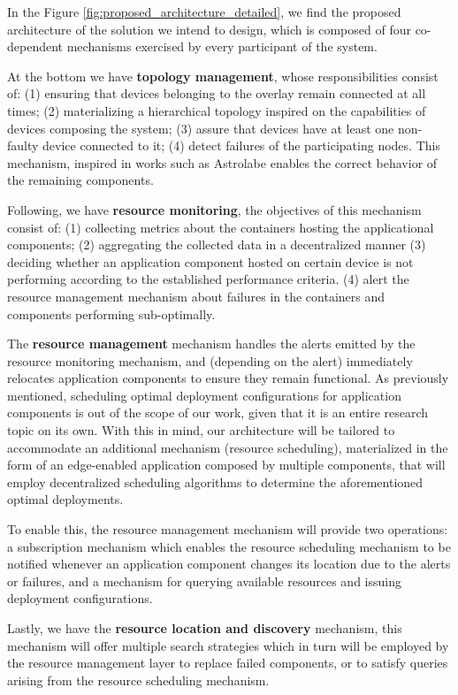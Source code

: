 In the Figure \ref{fig:proposed_architecture_detailed}, we find the proposed architecture of the solution we intend to design, which is composed of four co-dependent mechanisms exercised by every participant of the system.

At the bottom we have \textbf{topology management}, whose responsibilities consist of: (1) ensuring that devices belonging to the overlay remain connected at all times; (2) materializing a hierarchical topology inspired on the capabilities of devices composing the system; (3) assure that devices have at least one non-faulty device connected to it; (4) detect failures of the participating nodes. This mechanism, inspired in works such as Astrolabe \cite{Renesse2003} enables the correct behavior of the remaining components.

Following, we have \textbf{resource monitoring}, the objectives of this mechanism consist of: (1) collecting metrics about the containers hosting the applicational components; (2) aggregating the collected data in a decentralized manner (3) deciding whether an application component hosted on certain device is not performing according to the established performance criteria. (4) alert the resource management mechanism about failures in the containers and components performing sub-optimally.

The \textbf{resource management} mechanism handles the alerts emitted by the resource monitoring mechanism, and (depending on the alert) immediately relocates application components to ensure they remain functional. As previously mentioned, scheduling optimal deployment configurations for application components is out of the scope of our work, given that it is an entire research topic on its own. With this in mind, our architecture will be tailored to accommodate an additional mechanism (resource scheduling), materialized in the form of an edge-enabled application composed by multiple components, that will employ decentralized scheduling algorithms to determine the aforementioned optimal deployments.

To enable this, the resource management mechanism will provide two operations: a subscription mechanism which enables the resource scheduling mechanism to be notified whenever an application component changes its location due to the alerts or failures, and a mechanism for querying available resources and issuing deployment configurations. 

Lastly, we have the \textbf{resource location and discovery} mechanism, this mechanism will offer multiple search strategies which in turn will be employed by the resource management layer to replace failed components, or to satisfy queries arising from the resource scheduling mechanism.

